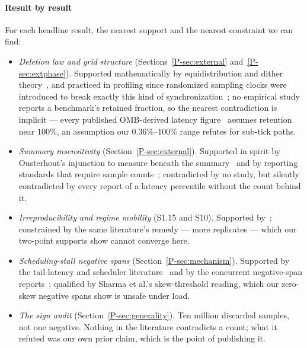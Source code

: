 \documentclass[10pt,journal,onecolumn]{IEEEtran}
\newcommand{\mainGenerality}{\ref{P-sec:generality}}       %
\newcommand{\mainModeB}{\ref{P-sec:external}}              %
\newcommand{\mainPhase}{\ref{P-sec:extphase}}            %
\newcommand{\mainModeA}{\ref{P-sec:mechanism}}             %
\begin{document}
\paragraph{Result by result} For each headline result, the nearest support and the nearest
constraint we can find:
\begin{itemize}
\item \emph{Deletion law and grid structure} (Sections~\mainModeB{} and~\mainPhase{}).
  Supported mathematically by equidistribution and dither
  theory~\cite{weyl1916gleichverteilung,sos1958distribution,schuchman1964dither}, and
  practiced in profiling since randomized sampling clocks were introduced to break exactly
  this kind of synchronization~\cite{mccanne1993randomized}; no empirical
  study reports a benchmark's retained fraction, so the nearest contradiction is implicit ---
  every published OMB-derived latency figure~\cite{openmessaging2018} assumes retention near
  $100\%$, an assumption our $0.36\%$--$100\%$ range refutes for sub-tick paths.
\item \emph{Summary insensitivity} (Section~\mainModeB{}). Supported in spirit by
  Ousterhout's injunction to measure beneath the summary~\cite{ousterhout2018deeper} and by
  reporting standards that require sample counts~\cite{hoefler2015benchmarking}; contradicted by no
  study, but silently contradicted by every report of a latency percentile without the count
  behind it.
\item \emph{Irreproducibility and regime mobility} (S1.15 and S10). Supported
  by~\cite{mytkowicz2009wrong,georges2007rigorous,barrett2017warmup,maricq2018taming};
  constrained by the same literature's remedy --- more replicates --- which our two-point
  supports show cannot converge here.
\item \emph{Scheduling-stall negative spans} (Section~\mainModeA{}). Supported
  by the tail-latency and scheduler literature~\cite{li2014tales,dean2013tail,lozi2016wastedcores}
  and by the concurrent negative-span reports~\cite{sharma2026causality}; qualified by Sharma et
  al.'s skew-threshold reading, which our zero-skew negative spans show is unsafe under load.
\item \emph{The sign audit} (Section~\mainGenerality{}). Ten million discarded samples, not
  one negative. Nothing in the literature contradicts a count; what it refuted was our own prior
  claim, which is the point of publishing it.
\end{itemize}
\end{document}

